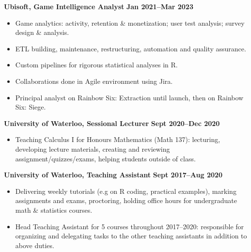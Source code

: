 \documentclass[11pt, oneside]{article}   	%
\begin{document}
\textbf{Ubisoft, Game Intelligence Analyst} \hfill \textbf{Jan 2021--Mar 2023}
\vspace{-4pt}
\begin{itemize}
\item Game analytics: activity, retention \& monetization; user test analysis; survey design \& analysis.
\vspace{-4pt}
\item ETL building, maintenance, restructuring, automation and quality assurance.
\vspace{-4pt}
\item Custom pipelines for rigorous statistical analyses in R.
\vspace{-4pt}
\item Collaborations done in Agile environment using Jira.
\vspace{-4pt}
\item Principal analyst on Rainbow Six: Extraction until launch, then on Rainbow Six: Siege.
\end{itemize}

\vspace{4pt}

\textbf{University of Waterloo, Sessional Lecturer} \hfill \textbf{Sept 2020--Dec 2020}
\vspace{-4pt}
\begin{itemize}
\item Teaching Calculus I for Honours Mathematics (Math 137): lecturing, developing lecture materials, creating and reviewing assignment/quizzes/exams, helping students outside of class.
\end{itemize}

\vspace{4pt}

\textbf{University of Waterloo, Teaching Assistant} \hfill \textbf{Sept 2017--Aug 2020}
\vspace{-4pt}
\begin{itemize}
\item Delivering weekly tutorials (e.g on R coding, practical examples), marking assignments and exams, proctoring, holding office hours for undergraduate math \& statistics courses.
\vspace{-4pt}
\item Head Teaching Assistant for 5 courses throughout 2017--2020: responsible for organizing and delegating tasks to the other teaching assistants in addition to above duties.
\end{itemize}

\vspace{4pt}
\end{document}
